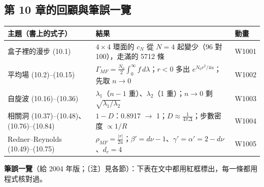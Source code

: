 \subsection{第 10 章的回顧與筆誤一覽}
\begin{center}
\footnotesize\setlength{\tabcolsep}{4pt}
\begin{tabular}{@{}lll@{}}
\toprule
主題（書上的式子） & 結果 & 動畫\\
\midrule
盒子裡的漫步 (10.1) & $4\times4$ 環面的 $c_N$ 從 $N=4$ 起變少（96 對 100），走滿的 5712 條 & W1001\\
平均場 (10.2)--(10.15) & $\Gamma_{MF}=\frac{N_0}2\int_0^\infty f\,d\lambda$；$r<0$ 多出 $e^{N_0r^2/4u}$；先取 $n\to0$ & W1002\\
自旋波 (10.16)--(10.36) & $\lambda_1$（$n-1$ 重）、$\lambda_2$（1 重）；$n\to0$ 剩 $\sqrt{\lambda_1/\lambda_2}$ & W1003\\
相關洞 (10.37)--(10.48)、(10.76)--(10.84) & $1-D$：0.8917 $\to$ 1；$D\approx\frac1{4\pi\Delta}$；步數密度 $\propto1/R$ & W1004\\
Redner--Reynolds (10.49)--(10.75) & $\rho_{MF}=\frac{|r|}{2u}$；$\beta'=d\nu-1$、$\gamma'=\alpha'=2-d\nu$、$d_c=4$ & W1005\\
\bottomrule
\end{tabular}
\end{center}
\textbf{筆誤一覽}（給 2004 年版；〔注〕見各節）：下表在文中都用紅框標出，每一條都用程式核對過。
\begin{center}
\footnotesize\renewcommand{\arraystretch}{0.9}
\TenTabErrata
\end{center}
